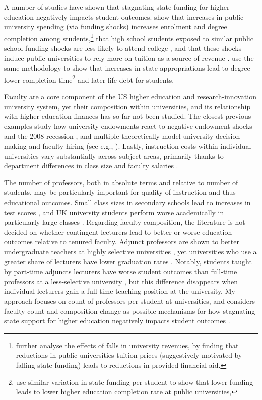 A number of studies have shown that stagnating state funding for higher education negatively impacts student outcomes.
\cite{NBERw23736} show that increases in public university spending (via funding shocks) increases enrolment and degree completion among students,\footnote{
    \cite{miller2022making} further analyse the effects of falls in university revenues, by finding that reductions in public universities tuition prices (suggestively motivated by falling state funding) leads to reductions in provided financial aid.
}
that high school students exposed to similar public school funding shocks are less likely to attend college \citep{jackson2021school}, and that these shocks induce public universities to rely more on tuition as a source of revenue \citep{bound2019public}.
\cite{NBERw27885} use the same methodology to show that increases in state appropriations lead to degree lower completion time\footnote{
    \cite{bound2007cohort} use similar variation in state funding per student to show that lower funding leads to lower higher education completion rate at public universities, 
} and later-life debt for students.

Faculty are a core component of the US higher education and research-innovation university system, yet their composition within universities, and its relationship with higher education finances has so far not been studied.
The closest previous examples study  how university endowments react to negative endowment shocks \citep{brown2014endowment} and the 2008 recession \citep{turner2014impact}, and multiple theoretically model university decision-making and faculty hiring (see e.g., \citealt{abe2015implications,johnson2009jep,NBERc13879}).
Lastly, instruction costs within individual universities vary substantially across subject areas, primarily thanks to department differences in class size and faculty salaries \citep{hemelt2021math}.

The number of professors, both in absolute terms and relative to number of students, may be particularly important for quality of instruction and thus educational outcomes.
Small class sizes in secondary schools lead to increases in test scores \citep{angrist1999using}, and UK university students perform worse academically in particularly large classes \citep{bandiera2010heterogeneous}.
Regarding faculty composition, the literature is not decided on whether contingent lecturers lead to better or worse education outcomes relative to tenured faculty.
Adjunct professors are shown to better undergraduate teachers at highly selective universities \citep{bettinger2010does,figlio2015tenure}, yet universities who use a greater share of lecturers have lower graduation rates \citep{ehrenberg2005tenured}.
Notably, students taught by part-time adjuncts lecturers have worse student outcomes than full-time professors at a less-selective university \citep{zhu2021limited}, but this difference disappears when individual lecturers gain a full-time teaching position at the university. 
My approach focuses on count of professors per student at universities, and considers faculty count and composition change as possible mechanisms for how stagnating state support for higher education negatively impacts student outcomes \citep{NBERw23736,NBERw27885}.

